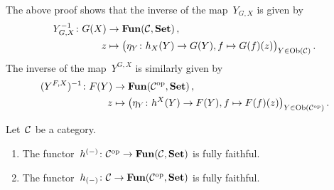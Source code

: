 \begin{remark}
  The above proof shows that the inverse of the map~$Y_{G,X}$ is given by
  \begin{align*}
              Y_{G,X}^{-1}
     \colon   G(X)
    &\to      \mathbf{Fun}(\mathcal{C}, \mathbf{Set}) \,,
    \\
              z
    &\mapsto  \bigl( \eta_Y \colon h_X(Y) \to G(Y), f \mapsto G(f)(z) \bigr)_{Y \in \operatorname{Ob}(\mathcal{C})} \,.
  \end{align*}
  The inverse of the map~$Y^{G,X}$ is similarly given by
  \begin{align*}
              (Y^{F,X})^{-1}
     \colon   F(Y)
    &\to      \mathbf{Fun}(\mathcal{C}^{\mathrm{op}}, \mathbf{Set}) \,,
    \\
              z
    &\mapsto  \bigl( \eta_Y \colon h^X(Y) \to F(Y), f \mapsto F(f)(z) \bigr)_{Y \in \operatorname{Ob}(\mathcal{C}^{\mathrm{op}})} \,.
  \end{align*}
\end{remark}







\begin{theorem}
  Let~$\mathcal{C}$ be a category.
  \begin{enumerate}
    \item
      The functor~$h^{(-)} \colon \mathcal{C}^{\mathrm{op}} \to \mathbf{Fun}(\mathcal{C}, \mathbf{Set})$ is fully faithful.
    \item
      \label{contravariant yoneda embedding}
      The functor~$h_{(-)} \colon \mathcal{C} \to \mathbf{Fun}(\mathcal{C}^{\mathrm{op}}, \mathbf{Set})$ is fully faithful.
  \end{enumerate}
\end{theorem}


